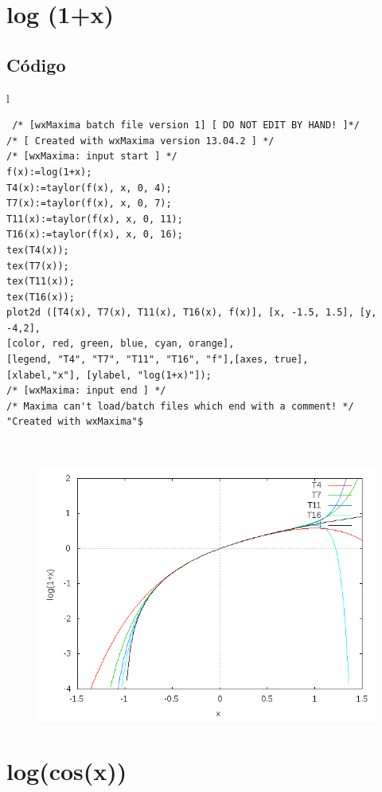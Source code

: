 \documentclass[10pt]{article}
\begin{document}
\section{log (1+x)}



\subsection{Código}
\begin{tabular}{l}
\begin{verbatim}  
 /* [wxMaxima batch file version 1] [ DO NOT EDIT BY HAND! ]*/
/* [ Created with wxMaxima version 13.04.2 ] */
/* [wxMaxima: input start ] */
f(x):=log(1+x);
T4(x):=taylor(f(x), x, 0, 4);
T7(x):=taylor(f(x), x, 0, 7);
T11(x):=taylor(f(x), x, 0, 11);
T16(x):=taylor(f(x), x, 0, 16);
tex(T4(x));
tex(T7(x));
tex(T11(x));
tex(T16(x));
plot2d ([T4(x), T7(x), T11(x), T16(x), f(x)], [x, -1.5, 1.5], [y, -4,2],
[color, red, green, blue, cyan, orange],
[legend, "T4", "T7", "T11", "T16", "f"],[axes, true],
[xlabel,"x"], [ylabel, "log(1+x)"]);
/* [wxMaxima: input end ] */
/* Maxima can't load/batch files which end with a comment! */
"Created with wxMaxima"$
\end{verbatim} \\
\begin{figure}
  \centering
    \includegraphics[scale=0.4]{log1}
\end{figure}
\end{tabular}



\newpage

\section{log(cos(x))}
\end{document}
